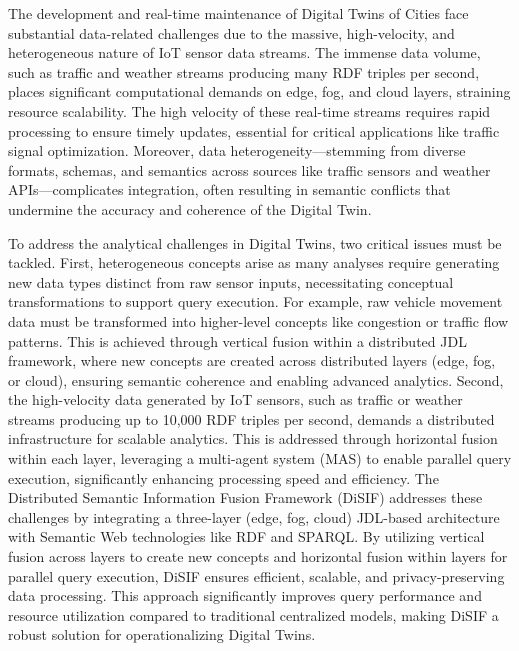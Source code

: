\documentclass[5p,times]{elsarticle}
\begin{document}
The development and real-time maintenance of Digital Twins
 of Cities face substantial data-related challenges due to the massive,
  high-velocity, and heterogeneous nature of IoT sensor data
 streams. The immense data volume, such as traffic and weather
 streams producing many RDF triples per second, places
 significant computational demands on edge, fog, and cloud layers, straining resource scalability. The high velocity of these
 real-time streams requires rapid processing to ensure timely
 updates, essential for critical applications like traffic signal optimization. Moreover, data heterogeneity—stemming from diverse formats, schemas, and semantics across sources like traffic
 sensors and weather APIs—complicates integration, often resulting in semantic conflicts that undermine the accuracy and
 coherence of the Digital Twin. 
 
 To address the analytical challenges in Digital Twins, two critical issues must be tackled.
 First, heterogeneous concepts arise as many analyses require generating new data types distinct from raw sensor inputs,
  necessitating conceptual transformations to support query execution. For example,
   raw vehicle movement data must be transformed into higher-level concepts
    like congestion or traffic flow patterns. This is achieved through vertical fusion within
     a distributed JDL framework, where new concepts are created across distributed layers 
     (edge, fog, or cloud), ensuring semantic coherence and enabling advanced analytics.
      Second, the high-velocity data generated by IoT sensors, such as traffic or weather
       streams producing up to 10,000 RDF triples per second, demands a distributed infrastructure
        for scalable analytics. This is addressed through horizontal fusion within each layer,
         leveraging a multi-agent system (MAS) to enable parallel query execution, significantly enhancing processing speed and efficiency.
The Distributed Semantic Information Fusion Framework (DiSIF) addresses these challenges by integrating a three-layer
 (edge, fog, cloud) JDL-based architecture with Semantic Web technologies like RDF and SPARQL. By utilizing vertical 
 fusion across layers to create new concepts and horizontal fusion within layers for parallel query execution,
  DiSIF ensures efficient, scalable, and privacy-preserving data processing. This approach significantly improves query
   performance and resource utilization compared to traditional centralized models, making DiSIF a robust solution for
    operationalizing Digital Twins.
\end{document}
